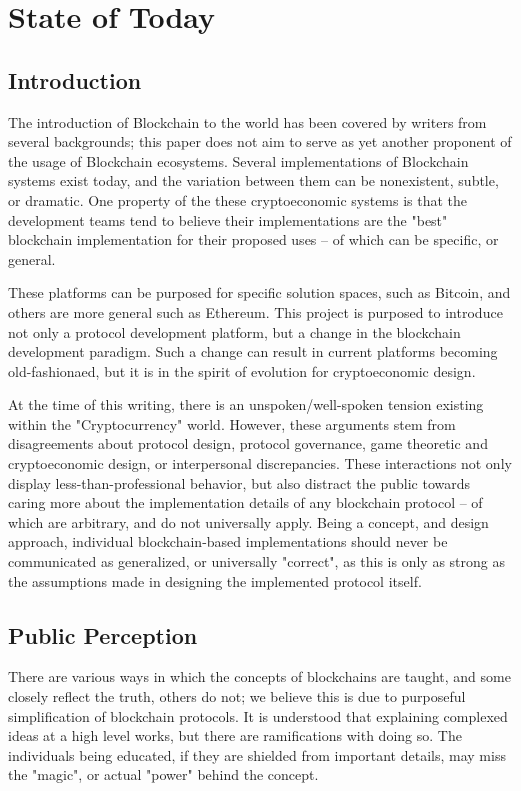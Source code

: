 \documentclass[12pt, titlepage, twocolumn]{report}
\begin{document}
\chapter{State of Today}

\section{Introduction}
The introduction of Blockchain to the world has been covered by writers from several backgrounds; this paper does not aim to serve as yet another proponent of the usage of Blockchain ecosystems. Several implementations of Blockchain systems exist today, and the variation between them can be nonexistent, subtle, or dramatic. One property of the these cryptoeconomic systems is that the development teams tend to believe their implementations are the "best" blockchain implementation for their proposed uses -- of which can be specific, or general. 

These platforms can be purposed for specific solution spaces, such as Bitcoin, and others are more general such as Ethereum. This project is purposed to introduce not only a protocol development platform, but a change in the blockchain development paradigm. Such a change can result in current platforms becoming old-fashionaed, but it is in the spirit of evolution for cryptoeconomic design.

At the time of this writing, there is an unspoken/well-spoken tension existing within the "Cryptocurrency" world. However, these arguments stem from disagreements about protocol design, protocol governance, game theoretic and cryptoeconomic design, or interpersonal discrepancies. These interactions not only display less-than-professional behavior, but also distract the public towards caring more about the implementation details of any blockchain protocol -- of which are arbitrary, and do not universally apply. Being a concept, and design approach, individual blockchain-based implementations should never be communicated as generalized, or universally "correct", as this is only as strong as the assumptions made in designing the implemented protocol itself.





\section{Public Perception}
There are various ways in which the concepts of blockchains are taught, and some closely reflect the truth, others do not; we believe this is due to purposeful simplification of blockchain protocols. It is understood that explaining complexed ideas at a high level works, but there are ramifications with doing so. The individuals being educated, if they are shielded from important details, may miss the "magic", or actual "power" behind the concept.  
\end{document}
